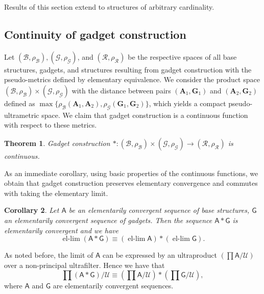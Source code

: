 \documentclass[11pt]{article}
\theoremstyle{plain}
\newtheorem{theorem}{Theorem}[section]
\newtheorem{corollary}[theorem]{Corollary}
\theoremstyle{definition}
\theoremstyle{remark}
\newcommand{\str}[1]{\mathbf{#1}}
\newcommand{\strseq}[1]{{\boldsymbol{\mathsf{#1}}}}
\DeclareMathOperator{\ellim}{el-lim}
\begin{document}
Results of this section extend to structures of arbitrary cardinality.

\subsection{Continuity of gadget construction}\label{ssec:continuity_of_gadget_construction}

Let $(\mathcal{B},\rho_\mathcal{B}), (\mathcal{G},\rho_\mathcal{G})$, and $(\mathcal{R}, \rho_\mathcal{R})$ be the respective spaces of all base structures, gadgets, and structures resulting from gadget construction with the pseudo-metrics defined by elementary equivalence.
We consider the product space $(\mathcal{B},\rho_\mathcal{B}) \times (\mathcal{G}, \rho_\mathcal{G})$ with the distance between pairs $(\str{A}_1, \str{G}_1)$ and $(\str{A}_2, \str{G}_2)$ defined as $\max\{ \rho_\mathcal{B}(\str{A}_1, \str{A}_2), \rho_\mathcal{G}(\str{G}_1, \str{G}_2) \}$, which yields a compact pseudo-ultrametric space.
We claim that gadget construction is a continuous function with respect to these metrics.

\begin{theorem}\label{thm:continuity_of_gadget_construction}
    Gadget construction $*: (\mathcal{B}, \rho_\mathcal{B}) \times (\mathcal{G}, \rho_\mathcal{G}) \to (\mathcal{R}, \rho_\mathcal{R})$ is continuous.
\end{theorem}

As an immediate corollary, using basic properties of the continuous functions, we obtain that gadget construction preserves elementary convergence and commutes with taking the elementary limit.

\begin{corollary}\label{cor:preservation_of_elementary_convergence}
    Let $\strseq{A}$ be an elementarily convergent sequence of base structures, $\strseq{G}$ an elementarily convergent sequence of gadgets.
    Then the sequence $\strseq{A} * \strseq{G}$ is elementarily convergent and we have
    \[
        \ellim (\strseq{A}*\strseq{G}) \equiv (\ellim \strseq{A})*(\ellim \strseq{G})
        .
    \]
\end{corollary}

As noted before, the limit of $\strseq{A}$ can be expressed by an ultraproduct $\left( \prod \strseq{A} / \mathcal{U} \right)$ over a non-principal ultrafilter.
Hence we have that
\[
    \prod (\strseq{A} * \strseq{G}) / \mathcal{U} 
    \equiv
    \left( \prod \strseq{A} / \mathcal{U} \right)
    * 
    \left( \prod \strseq{G} / \mathcal{U} \right)
    ,
\]
where $\strseq{A}$ and $\strseq{G}$ are elementarily convergent sequences.
\end{document}
